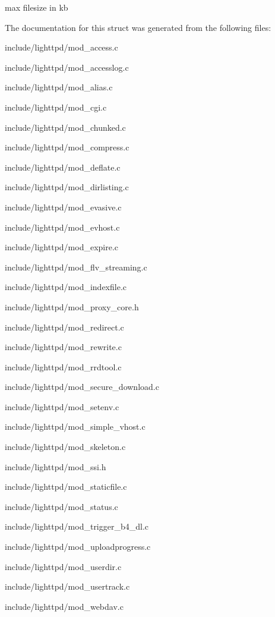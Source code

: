 max filesize in kb 

The documentation for this struct was generated from the following files:\begin{CompactItemize}
\item 
include/lighttpd/mod\_\-access.c\item 
include/lighttpd/mod\_\-accesslog.c\item 
include/lighttpd/mod\_\-alias.c\item 
include/lighttpd/mod\_\-cgi.c\item 
include/lighttpd/mod\_\-chunked.c\item 
include/lighttpd/mod\_\-compress.c\item 
include/lighttpd/mod\_\-deflate.c\item 
include/lighttpd/mod\_\-dirlisting.c\item 
include/lighttpd/mod\_\-evasive.c\item 
include/lighttpd/mod\_\-evhost.c\item 
include/lighttpd/mod\_\-expire.c\item 
include/lighttpd/mod\_\-flv\_\-streaming.c\item 
include/lighttpd/mod\_\-indexfile.c\item 
include/lighttpd/mod\_\-proxy\_\-core.h\item 
include/lighttpd/mod\_\-redirect.c\item 
include/lighttpd/mod\_\-rewrite.c\item 
include/lighttpd/mod\_\-rrdtool.c\item 
include/lighttpd/mod\_\-secure\_\-download.c\item 
include/lighttpd/mod\_\-setenv.c\item 
include/lighttpd/mod\_\-simple\_\-vhost.c\item 
include/lighttpd/mod\_\-skeleton.c\item 
include/lighttpd/mod\_\-ssi.h\item 
include/lighttpd/mod\_\-staticfile.c\item 
include/lighttpd/mod\_\-status.c\item 
include/lighttpd/mod\_\-trigger\_\-b4\_\-dl.c\item 
include/lighttpd/mod\_\-uploadprogress.c\item 
include/lighttpd/mod\_\-userdir.c\item 
include/lighttpd/mod\_\-usertrack.c\item 
include/lighttpd/mod\_\-webdav.c\end{CompactItemize}
